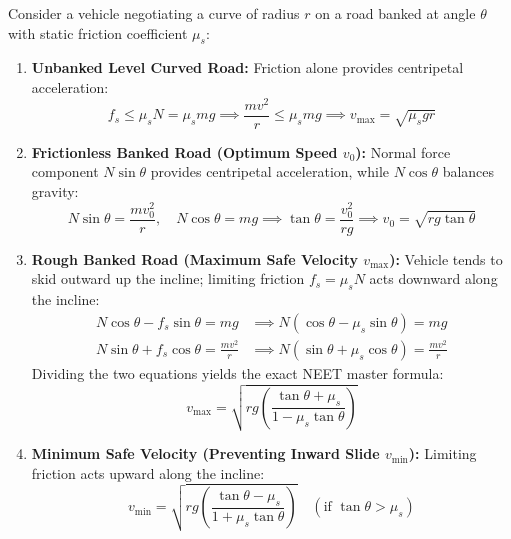 \documentclass[10pt,twoside,openright]{book}
\begin{document}
\begin{formulabox}
Consider a vehicle negotiating a curve of radius $r$ on a road banked at angle $\theta$ with static friction coefficient $\mu_s$:
\begin{enumerate}[leftmargin=*]
  \item \textbf{Unbanked Level Curved Road:} Friction alone provides centripetal acceleration:
  \begin{equation}
    f_s \le \mu_s N = \mu_s mg \implies \frac{mv^2}{r} \le \mu_s mg \implies v_{\max} = \sqrt{\mu_s g r}
  \end{equation}
  \item \textbf{Frictionless Banked Road (Optimum Speed $v_0$):} Normal force component $N\sin\theta$ provides centripetal acceleration, while $N\cos\theta$ balances gravity:
  \begin{equation}
    N\sin\theta = \frac{mv_0^2}{r}, \quad N\cos\theta = mg \implies \tan\theta = \frac{v_0^2}{rg} \implies v_0 = \sqrt{rg\tan\theta}
  \end{equation}
  \item \textbf{Rough Banked Road (Maximum Safe Velocity $v_{\max}$):} Vehicle tends to skid outward up the incline; limiting friction $f_s = \mu_s N$ acts downward along the incline:
  \begin{align}
    N\cos\theta - f_s\sin\theta = mg &\implies N(\cos\theta - \mu_s\sin\theta) = mg \\
    N\sin\theta + f_s\cos\theta = \frac{mv^2}{r} &\implies N(\sin\theta + \mu_s\cos\theta) = \frac{mv^2}{r}
  \end{align}
  Dividing the two equations yields the exact NEET master formula:
  \begin{equation}
    v_{\max} = \sqrt{rg\left(\frac{\tan\theta + \mu_s}{1 - \mu_s\tan\theta}\right)}
  \end{equation}
  \item \textbf{Minimum Safe Velocity (Preventing Inward Slide $v_{\min}$):} Limiting friction acts upward along the incline:
  \begin{equation}
    v_{\min} = \sqrt{rg\left(\frac{\tan\theta - \mu_s}{1 + \mu_s\tan\theta}\right)} \quad (\text{if } \tan\theta > \mu_s)
  \end{equation}
\end{enumerate}
\end{formulabox}
\end{document}
